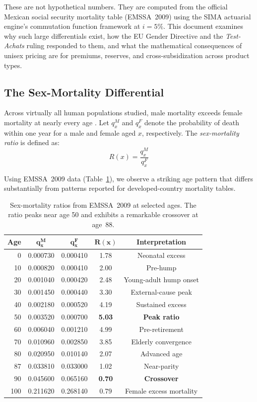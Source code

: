 \documentclass[12pt,a4paper]{article}
\newcommand{\qx}[1]{q_{#1}}
\begin{document}
These are not hypothetical numbers. They are computed from the official Mexican
social security mortality table (EMSSA~2009) using the SIMA actuarial engine's
commutation function framework at $i = 5\%$. This document examines why such
large differentials exist, how the EU Gender Directive and the \emph{Test-Achats}
ruling responded to them, and what the mathematical consequences of unisex
pricing are for premiums, reserves, and cross-subsidization across product types.

\subsection{The Sex-Mortality Differential}

Across virtually all human populations studied, male mortality exceeds female
mortality at nearly every age \cite{beltran2015}. Let $\qx{x}^M$ and $\qx{x}^F$ denote the
probability of death within one year for a male and female aged $x$,
respectively. The \emph{sex-mortality ratio} is defined as:
\begin{equation}
\label{eq:sex-ratio}
  R(x) = \frac{\qx{x}^M}{\qx{x}^F}
\end{equation}

Using EMSSA~2009 data (Table~\ref{tab:sex-ratio}), we observe a striking
age pattern that differs substantially from patterns reported for
developed-country mortality tables.

\begin{table}[H]
\centering
\caption{Sex-mortality ratios from EMSSA~2009 at selected ages. The ratio peaks
near age 50 and exhibits a remarkable crossover at age~88.}
\label{tab:sex-ratio}
\begin{tabular}{rcccc}
\toprule
\textbf{Age} & $\bm{\qx{x}^M}$ & $\bm{\qx{x}^F}$ & $\bm{R(x)}$ & \textbf{Interpretation} \\
\midrule
 0  & 0.000730 & 0.000410 & 1.78 & Neonatal excess \\
10  & 0.000820 & 0.000410 & 2.00 & Pre-hump \\
20  & 0.001040 & 0.000420 & 2.48 & Young-adult hump onset \\
30  & 0.001450 & 0.000440 & 3.30 & External-cause peak \\
40  & 0.002180 & 0.000520 & 4.19 & Sustained excess \\
50  & 0.003520 & 0.000700 & \textbf{5.03} & \textbf{Peak ratio} \\
60  & 0.006040 & 0.001210 & 4.99 & Pre-retirement \\
70  & 0.010960 & 0.002850 & 3.85 & Elderly convergence \\
80  & 0.020950 & 0.010140 & 2.07 & Advanced age \\
87  & 0.033810 & 0.033000 & 1.02 & Near-parity \\
90  & 0.045600 & 0.065160 & \textbf{0.70} & \textbf{Crossover} \\
100 & 0.211620 & 0.268140 & 0.79 & Female excess mortality \\
\bottomrule
\end{tabular}
\end{table}
\end{document}
